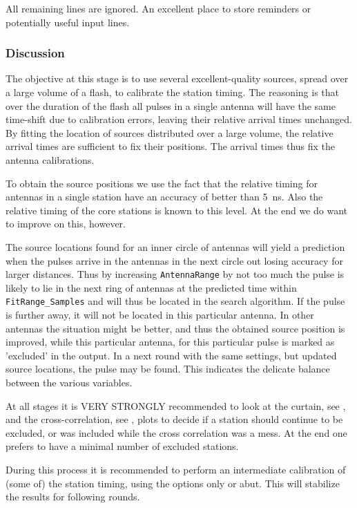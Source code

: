 All remaining lines are ignored. An excellent place to store reminders or potentially useful input lines.

\subsubsection{Discussion}

The objective at this stage is to use several excellent-quality sources, spread over a large volume of a flash, to calibrate the station timing. The reasoning is that over the duration of the flash all pulses in a single antenna will have the same time-shift due to calibration errors, leaving their relative arrival times unchanged. By fitting the location of sources distributed over a large volume, the relative arrival times are sufficient to fix their positions. The arrival times thus fix the antenna calibrations.

To obtain the source positions we use the fact that the relative timing for antennas in a single station have an accuracy of better than 5~ns. Also the relative timing of the core stations is known to this level. At the end we do want to improve on this, however.

The source locations found for an inner circle of antennas will yield a prediction when the pulses arrive in the antennas in the next circle out losing accuracy for larger distances. Thus by increasing \verb!AntennaRange! by not too much the pulse is likely to lie in the next ring of antennas at the predicted time within \verb!FitRange_Samples! and will thus be located in the search algorithm. If the pulse is further away, it will not be located in this particular antenna. In other antennas the situation might be better, and thus the obtained source position is improved, while this particular antenna, for this particular pulse is marked as 'excluded' in the output. In a next round with the same settings, but updated source locations, the pulse may be found. This indicates the delicate balance between the various variables.

At all stages it is VERY STRONGLY recommended to look at the curtain, see , and the cross-correlation, see  , plots to decide if a station should continue to be excluded, or was included while the cross correlation was a mess. At the end one prefers to have a minimal number of excluded stations.

During this process it is recommended to perform an intermediate calibration of (some of) the station timing, using the options only or abut. This will stabilize the results for following rounds.

